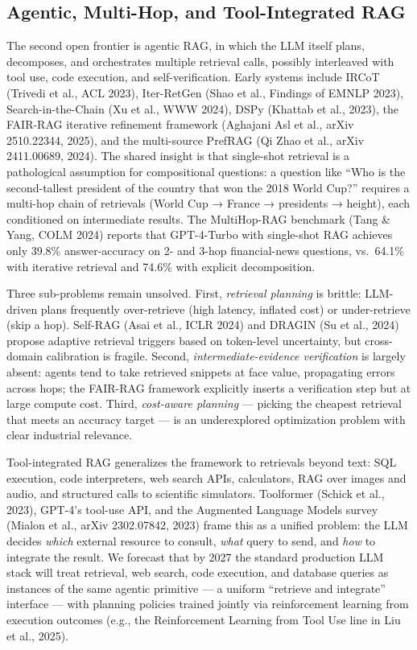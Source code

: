 \subsection{Agentic, Multi-Hop, and Tool-Integrated RAG}\label{agentic-multi-hop-and-tool-integrated-rag}

The second open frontier is agentic RAG, in which the LLM itself plans, decomposes, and orchestrates multiple retrieval calls, possibly interleaved with tool use, code execution, and self-verification. Early systems include IRCoT (Trivedi et al., ACL 2023), Iter-RetGen (Shao et al., Findings of EMNLP 2023), Search-in-the-Chain (Xu et al., WWW 2024), DSPy (Khattab et al., 2023), the FAIR-RAG iterative refinement framework (Aghajani Asl et al., arXiv 2510.22344, 2025), and the multi-source PrefRAG (Qi Zhao et al., arXiv 2411.00689, 2024). The shared insight is that single-shot retrieval is a pathological assumption for compositional questions: a question like ``Who is the second-tallest president of the country that won the 2018 World Cup?'' requires a multi-hop chain of retrievals (World Cup → France → presidents → height), each conditioned on intermediate results. The MultiHop-RAG benchmark (Tang \& Yang, COLM 2024) reports that GPT-4-Turbo with single-shot RAG achieves only 39.8\% answer-accuracy on 2- and 3-hop financial-news questions, vs.~64.1\% with iterative retrieval and 74.6\% with explicit decomposition.

Three sub-problems remain unsolved. First, \emph{retrieval planning} is brittle: LLM-driven plans frequently over-retrieve (high latency, inflated cost) or under-retrieve (skip a hop). Self-RAG (Asai et al., ICLR 2024) and DRAGIN (Su et al., 2024) propose adaptive retrieval triggers based on token-level uncertainty, but cross-domain calibration is fragile. Second, \emph{intermediate-evidence verification} is largely absent: agents tend to take retrieved snippets at face value, propagating errors across hops; the FAIR-RAG framework explicitly inserts a verification step but at large compute cost. Third, \emph{cost-aware planning} --- picking the cheapest retrieval that meets an accuracy target --- is an underexplored optimization problem with clear industrial relevance.

Tool-integrated RAG generalizes the framework to retrievals beyond text: SQL execution, code interpreters, web search APIs, calculators, RAG over images and audio, and structured calls to scientific simulators. Toolformer (Schick et al., 2023), GPT-4's tool-use API, and the Augmented Language Models survey (Mialon et al., arXiv 2302.07842, 2023) frame this as a unified problem: the LLM decides \emph{which} external resource to consult, \emph{what} query to send, and \emph{how} to integrate the result. We forecast that by 2027 the standard production LLM stack will treat retrieval, web search, code execution, and database queries as instances of the same agentic primitive --- a uniform ``retrieve and integrate'' interface --- with planning policies trained jointly via reinforcement learning from execution outcomes (e.g., the Reinforcement Learning from Tool Use line in Liu et al., 2025).

